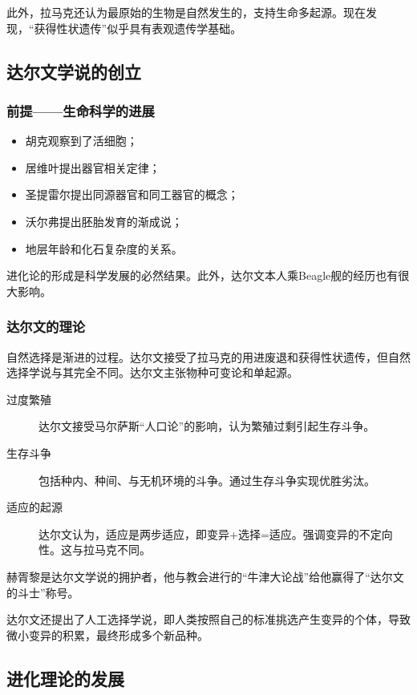 此外，拉马克还认为最原始的生物是自然发生的，支持生命多起源。现在发现，“获得性状遗传”似乎具有表观遗传学基础。

\subsection{达尔文学说的创立}

\subsubsection{前提——生命科学的进展}

\begin{itemize}
	\item 胡克观察到了活细胞；
	\item 居维叶提出器官相关定律；
	\item 圣提雷尔提出同源器官和同工器官的概念；
	\item 沃尔弗提出胚胎发育的渐成说；
	\item 地层年龄和化石复杂度的关系。
\end{itemize}

进化论的形成是科学发展的必然结果。此外，达尔文本人乘Beagle舰的经历也有很大影响。

\subsubsection{达尔文的理论}

自然选择是渐进的过程。达尔文接受了拉马克的用进废退和获得性状遗传，但自然选择学说与其完全不同。达尔文主张物种可变论和单起源。


\begin{description}
	\item[过度繁殖] 达尔文接受马尔萨斯“人口论”的影响，认为繁殖过剩引起生存斗争。
	\item[生存斗争] 包括种内、种间、与无机环境的斗争。通过生存斗争实现优胜劣汰。
	\item[适应的起源] 达尔文认为，适应是两步适应，即变异+选择=适应。强调变异的不定向性。这与拉马克不同。
\end{description}

赫胥黎是达尔文学说的拥护者，他与教会进行的“牛津大论战”给他赢得了“达尔文的斗士”称号。

达尔文还提出了人工选择学说，即人类按照自己的标准挑选产生变异的个体，导致微小变异的积累，最终形成多个新品种。

\subsection{进化理论的发展}

